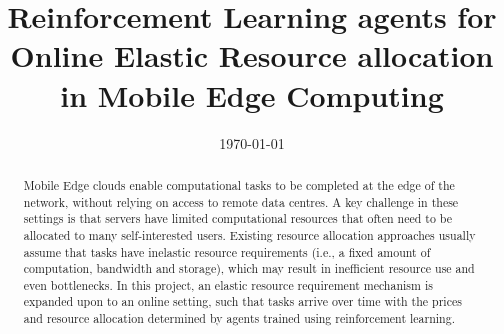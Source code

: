 \documentclass[sotoncolour]{extra/uos_project}     %
\title       {Reinforcement Learning agents for Online Elastic Resource allocation in Mobile Edge Computing}
\date       {\today}
\begin{document}
\frontmatter
\maketitle
\begin{abstract}
Mobile Edge clouds enable computational tasks to be completed at the edge of the network, without relying on access to
remote data centres. A key challenge in these settings is that servers have limited computational resources that often
need to be allocated to many self-interested users. Existing resource allocation approaches usually assume that tasks
have inelastic resource requirements (i.e., a fixed amount of computation, bandwidth and storage), which may result in
inefficient resource use and even bottlenecks. In this project, an elastic resource requirement mechanism is expanded
upon to an online setting, such that tasks arrive over time with the prices and resource allocation determined by
agents trained using reinforcement learning.
\end{abstract}

\tableofcontents
\listoffigures
\listoftables


\mainmatter










\backmatter
\appendix

\end{document}
